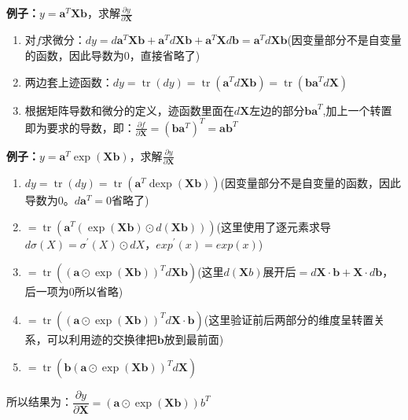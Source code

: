 \documentclass[UTF8]{article}
\begin{document}
    \textbf{例子：}$y=\mathbf{a}^{T} \mathbf{X} \mathbf{b}$，求解$\frac{\partial y}{\partial \mathbf{X}}$
    \begin{enumerate}
        \item 对$f$求微分：$d y=d \mathbf{a}^{T} \mathbf{X} \mathbf{b}+\mathbf{a}^{T} d \mathbf{X} \mathbf{b}+\mathbf{a}^{T} \mathbf{X} d \mathbf{b}=\mathbf{a}^{T} d \mathbf{X} \mathbf{b}$(因变量部分不是自变量的函数，因此导数为0，直接省略了)
        \item 两边套上迹函数：$d y=\operatorname{tr}(d y)=\operatorname{tr}\left(\mathbf{a}^{T} d \mathbf{X} \mathbf{b}\right)=\operatorname{tr}\left(\mathbf{b} \mathbf{a}^{T} d \mathbf{X}\right)$
        \item 根据矩阵导数和微分的定义，迹函数里面在$d\bm{X}$左边的部分$\bm{ba}^T$,加上一个转置即为要求的导数，即：$\frac{\partial f}{\partial \mathbf{X}}=\left(\mathbf{b} \mathbf{a}^{T}\right)^{T}=\bm{a b}^{T}$
    \end{enumerate}
    \textbf{例子：}$y=\mathbf{a}^{T} \exp (\mathbf{X} \mathbf{b})$，求解$\frac{\partial y}{\partial \mathbf{X}}$
    \begin{enumerate}
        \item $d y=\operatorname{tr}(d y)=\operatorname{tr}\left(\mathbf{a}^{T} \operatorname{dexp}(\mathbf{X b})\right)$(因变量部分不是自变量的函数，因此导数为0。$d\bm{a}^T=0$省略了)
        \item $=\operatorname{tr}\left(\mathbf{a}^{T}(\exp (\mathbf{X} \mathbf{b}) \odot d(\mathbf{X} \mathbf{b}))\right)$(这里使用了逐元素求导$d \sigma(X)=\sigma^{\prime}(X) \odot d X$，$exp^{\prime}(x)=exp(x)$)
        \item $=\operatorname{tr}\left((\mathbf{a} \odot \exp (\mathbf{X} \mathbf{b}))^{T} d \mathbf{X} \mathbf{b}\right)$(这里$d(\bm{X}b)$展开后$= d\bm{X}\cdot \bm{b} + \bm{X}\cdot d\bm{b}$，后一项为0所以省略)
        \item $=\operatorname{tr}\left((\mathbf{a} \odot \exp (\mathbf{X} \mathbf{b}))^{T} d \mathbf{X} \cdot \mathbf{b}\right)$(这里验证前后两部分的维度呈转置关系，可以利用迹的交换律把$\bm{b}$放到最前面)
        \item $=\operatorname{tr}\left(\mathbf{b}(\mathbf{a} \odot \exp (\mathbf{X b}))^{T} d \mathbf{X}\right)$
    \end{enumerate}
    所以结果为：$\dfrac{\partial y}{\partial \mathbf{X}}=(\mathbf{a} \odot \exp (\mathbf{X} \mathbf{b})) b^{T}$
\end{document}
